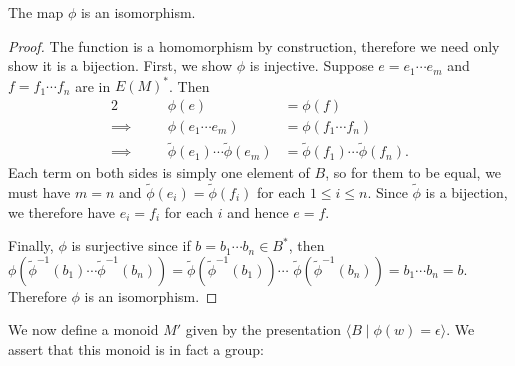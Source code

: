 \documentclass[noindex,noinsetproof,emphthm,12pt]{lmaths}
\begin{document}
\begin{lemma}
	The map $\phi$ is an isomorphism. \label{lma:phi-isomorphism}
\end{lemma}
\begin{proof}
	The function is a homomorphism by construction, therefore we need only show it is a bijection. First, we show $\phi$ is injective. Suppose $e = e_1\cdots e_m$ and $f = f_1\cdots f_n$ are in $E(M)^*$. Then
	\begin{alignat*}{2}
		&& \phi(e) &= \phi(f) \\
		\implies\quad&& \phi(e_1 \cdots e_m) &= \phi(f_1 \cdots f_n) \\
		\implies\quad&& \tilde\phi(e_1)\cdots\tilde\phi(e_m) &= \tilde\phi(f_1)\cdots\tilde\phi(f_n).
	\end{alignat*}
	Each term on both sides is simply one element of $B$, so for them to be equal, we must have $m = n$ and $\tilde\phi(e_i) = \tilde\phi(f_i)$ for each $1 \le i \le n$. Since $\tilde\phi$ is a bijection, we therefore have $e_i = f_i$ for each $i$ and hence $e = f$.

	Finally, $\phi$ is surjective since if $b = b_1 \cdots b_n \in B^*$, then $\phi(\tilde\phi^{-1}(b_1) \cdots \tilde\phi^{-1}(b_n)) = \tilde\phi(\tilde\phi^{-1}(b_1)) \cdots$ $\tilde\phi(\tilde\phi^{-1}(b_n)) = b_1$$\cdots b_n = b$. Therefore $\phi$ is an isomorphism.
\end{proof}

We now define a monoid $M'$ given by the presentation $\langle B \mid \phi(w) = \epsilon \rangle$. We assert that this monoid is in fact a group:
\end{document}
